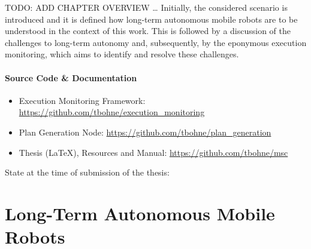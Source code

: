 \documentclass[english, master, utf8]{base/thesis_KBS}
\newcommand{\code}{\collectverb{\codebox}}
\begin{document}
TODO: ADD CHAPTER OVERVIEW \dots\newline
Initially, the considered scenario is introduced and it is defined how long-term autonomous mobile robots are to be understood in the context of this work.
This is followed by a discussion of the challenges to long-term autonomy and, subsequently, by the eponymous execution monitoring, which aims to identify
and resolve these challenges.

\vfill

\subsubsection*{Source Code \& Documentation}
\begin{itemize}
  \item Execution Monitoring Framework: \textcolor{link-color}{\url{https://github.com/tbohne/execution_monitoring}}
  \item Plan Generation Node: \textcolor{link-color}{\url{https://github.com/tbohne/plan_generation}}
  \item Thesis (\LaTeX{}), Resources and Manual: \textcolor{link-color}{\url{https://github.com/tbohne/msc}}
\end{itemize}
{\footnotesize State at the time of submission of the thesis: \code{git tag v1.0}}

\chapter{Long-Term Autonomous Mobile Robots}
\end{document}
